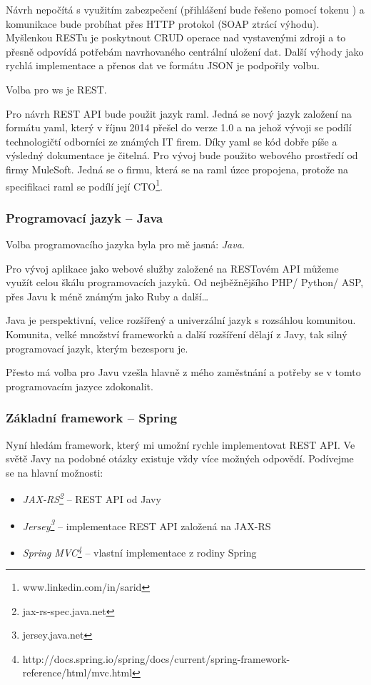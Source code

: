 \documentclass[thesis=B,czech]{FITthesis}[2012/06/26]
\begin{document}
Návrh nepočítá s využitím zabezpečení (přihlášení bude řešeno pomocí tokenu )  a komunikace bude probíhat přes HTTP protokol (SOAP ztrácí výhodu).
Myšlenkou RESTu je poskytnout CRUD\cite{ws_compare_steve} operace nad vystavenými zdroji\cite{ws_crud} a to přesně odpovídá potřebám navrhovaného centrální uložení dat.  Další výhody jako rychlá implementace a přenos dat ve formátu JSON je podpořily volbu. 

Volba pro \acrshort{ws} je REST.

\label{ws_compare_mulesoft}
Pro návrh REST API bude použit jazyk \acrshort{raml}. Jedná se nový jazyk založení na formátu \acrshort{yaml}, který v říjnu 2014 přešel do verze 1.0\cite{ws_raml} a na jehož vývoji se podílí technologičtí odborníci ze známých IT firem\cite{ws_raml_wiki}. Díky \acrshort{yaml} se kód dobře píše a výsledný dokumentace je čitelná. Pro vývoj bude použito webového prostředí od firmy MuleSoft\cite{ws_raml_mulesoft}. Jedná se o firmu, která se na \acrshort{raml} úzce propojena, protože na specifikaci \acrshort{raml} se  podílí její CTO\footnote{www.linkedin.com/in/sarid}.
\vspace*{1\baselineskip}


\subsubsection{Programovací jazyk -- Java}

Volba programovacího jazyka byla pro mě jasná: \textit{Java}.

Pro vývoj aplikace jako webové služby založené na RESTovém API můžeme využít celou škálu programovacích jazyků. Od nejběžnějšího PHP/ Python/ ASP, přes Javu k méně známým jako Ruby a další\dots

Java je perspektivní, velice rozšířený a univerzální jazyk s rozsáhlou komunitou. Komunita, velké množství frameworků a další rozšíření dělají z Javy, tak silný programovací jazyk, kterým bezesporu je.  

Přesto má volba pro Javu vzešla hlavně z mého zaměstnání a potřeby se v tomto programovacím jazyce zdokonalit. 

\subsubsection{Základní framework -- Spring}

Nyní hledám framework, který mi umožní rychle implementovat REST API. Ve světě Javy na podobné otázky existuje vždy více možných odpovědí. 
Podívejme se na hlavní možnosti:
\begin{itemize}
	\item \textit{JAX-RS\footnote{jax-rs-spec.java.net}} -- REST API od Javy
    \item \textit{Jersey\footnote{jersey.java.net}} -- implementace REST API založená na JAX-RS
    \item \textit{Spring MVC\footnote{http://docs.spring.io/spring/docs/current/spring-framework-reference/html/mvc.html}} -- vlastní implementace z rodiny Spring
\end{itemize}
\end{document}
